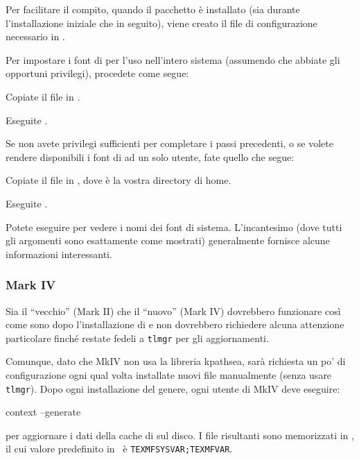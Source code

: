 \documentclass{article}
\begin{document}
Per facilitare il compito, quando il pacchetto  è
installato (sia durante l'installazione iniziale che in seguito), viene 
creato il file di configurazione necessario in
.

Per impostare i font di \TL{} per l'uso nell'intero sistema (assumendo che
abbiate gli opportuni privilegi), procedete come segue:
\begin{enumerate*}
\item Copiate il file  in
  .

\item Eseguite .
\end{enumerate*}

Se non avete privilegi sufficienti per completare i passi precedenti,
o se volete rendere disponibili i font di \TL{} ad un
solo utente, fate quello che segue:
\begin{enumerate*}
\item Copiate il file  in
  , dove \filename{~} è la vostra directory di
  home.

\item Eseguite .
\end{enumerate*}

Potete eseguire  per vedere i nomi dei font di sistema.
L'incantesimo  (dove tutti gli
argomenti sono esattamente come mostrati) generalmente fornisce alcune
informazioni interessanti.


\subsubsection{\protect\ConTeXt{} Mark IV}
\label{sec:context-mkiv}

Sia il ``vecchio'' \ConTeXt{} (Mark II) che il ``nuovo'' \ConTeXt{}
(Mark IV) dovrebbero funzionare così come sono dopo l'installazione
di \TL{} e non dovrebbero richiedere alcuna attenzione particolare finché
restate fedeli a \verb+tlmgr+ per gli aggiornamenti.

Comunque, dato che \ConTeXt{} MkIV non usa la libreria kpathsea,
sarà richiesta un po' di configurazione ogni qual volta installate nuovi
file manualmente (senza usare \verb+tlmgr+). Dopo ogni installazione del
genere, ogni utente di MkIV deve eseguire:
\begin{sverbatim}
context --generate
\end{sverbatim}
per aggiornare  i dati della cache di \ConTeXt{} sul disco.
I file risultanti sono memorizzati in , il cui valore
predefinito in \TL\ è \verb+TEXMFSYSVAR;TEXMFVAR+.
\end{document}
